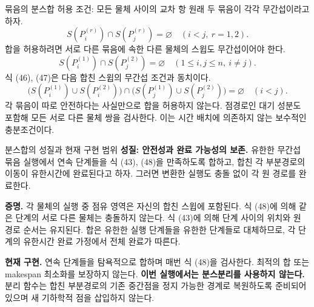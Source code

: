 \begin{frame}{묶음의 분스합 허용 조건: 모든 물체 사이의 교차 항}
\small
원래 두 묶음이 각각 무간섭이라고 하자.
\begin{equation}
 S(P_i^{(r)})\cap S(P_j^{(r)})=\varnothing
 \quad(i<j,\ r=1,2).
 \tag{46}\label{eq:safe-pair-merge}
\end{equation}
합을 허용하려면 서로 다른 묶음에 속한 다른 물체의 스윕도 무간섭이어야 한다.
\begin{equation}
 \boxed{S(P_i^{(1)})\cap S(P_j^{(2)})=\varnothing
 \quad(1\le i,j\le n,\ i\ne j).}
 \tag{47}\label{eq:merge-cross-terms}
\end{equation}
식 (46), (47)은 다음 합친 스윕의 무간섭 조건과 동치이다.
\begin{equation}
 \boxed{\bigl(S(P_i^{(1)})\cup S(P_i^{(2)})\bigr)
 \cap\bigl(S(P_j^{(1)})\cup S(P_j^{(2)})\bigr)=\varnothing
 \quad(i<j).}
 \tag{48}\label{eq:safe-tuple-merge}
\end{equation}
각 묶음이 따로 안전하다는 사실만으로 합을 허용하지 않는다.
점경로인 대기 성분도 포함해 모든 서로 다른 물체 쌍을 검사한다.
이는 시간 배치에 의존하지 않는 보수적인 충분조건이다.
\end{frame}

\begin{frame}{분스합의 성질과 현재 구현 범위}
\small
\textbf{성질: 안전성과 완료 가능성의 보존.}
유한한 무간섭 묶음 실행에서 연속 단계들을 식 (43), (48)을 만족하도록
합하고, 합친 각 부분경로의 이동이 유한시간에 완료된다고 하자.
그러면 변환한 실행도 충돌 없이 각 원 경로를 완료한다.
\medskip

\textbf{증명.} 각 물체의 실행 중 점유 영역은 자신의 합친 스윕에 포함된다.
식 (48)에 의해 같은 단계의 서로 다른 물체는 충돌하지 않는다.
식 (43)에 의해 단계 사이의 위치와 원 경로 순서는 유지된다.
합은 유한한 실행 단계들을 유한한 단계들로 대체하므로,
각 단계의 유한시간 완료 가정에서 전체 완료가 따른다.
\medskip

\textbf{현재 구현.} 연속 단계들을 탐욕적으로 합하며 매번 식 (48)을 검사한다.
최적의 합 또는 makespan 최소화를 보장하지 않는다.
\textbf{이번 실행에서는 분스분리를 사용하지 않는다.}
분리 함수는 합친 부분경로의 기존 중간점을 정지 가능한 경계로 복원하도록
준비되어 있으며 새 기하학적 점을 삽입하지 않는다.
\end{frame}



